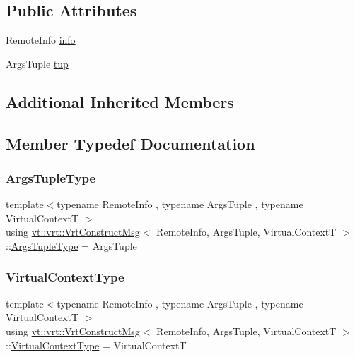 \subsection*{Public Attributes}
\begin{DoxyCompactItemize}
\item 
Remote\+Info \hyperlink{structvt_1_1vrt_1_1_vrt_construct_msg_a570a118633d088ea4b0cae7e0edfb716}{info}
\item 
Args\+Tuple \hyperlink{structvt_1_1vrt_1_1_vrt_construct_msg_a5d74ba39e846fba16e6cc83c33c21fe2}{tup}
\end{DoxyCompactItemize}
\subsection*{Additional Inherited Members}


\subsection{Member Typedef Documentation}
\mbox{\label{structvt_1_1vrt_1_1_vrt_construct_msg_a5ec9caa553a3004bce6a6ee151d15900}} 
\subsubsection{\texorpdfstring{Args\+Tuple\+Type}{ArgsTupleType}}
{\footnotesize\ttfamily template$<$typename Remote\+Info , typename Args\+Tuple , typename Virtual\+ContextT $>$ \\
using \hyperlink{structvt_1_1vrt_1_1_vrt_construct_msg}{vt\+::vrt\+::\+Vrt\+Construct\+Msg}$<$ Remote\+Info, Args\+Tuple, Virtual\+ContextT $>$\+::\hyperlink{structvt_1_1vrt_1_1_vrt_construct_msg_a5ec9caa553a3004bce6a6ee151d15900}{Args\+Tuple\+Type} =  Args\+Tuple}

\mbox{\label{structvt_1_1vrt_1_1_vrt_construct_msg_aa5ff9ea61a1fcefeb0272fa0f5b6adc9}} 
\subsubsection{\texorpdfstring{Virtual\+Context\+Type}{VirtualContextType}}
{\footnotesize\ttfamily template$<$typename Remote\+Info , typename Args\+Tuple , typename Virtual\+ContextT $>$ \\
using \hyperlink{structvt_1_1vrt_1_1_vrt_construct_msg}{vt\+::vrt\+::\+Vrt\+Construct\+Msg}$<$ Remote\+Info, Args\+Tuple, Virtual\+ContextT $>$\+::\hyperlink{structvt_1_1vrt_1_1_vrt_construct_msg_aa5ff9ea61a1fcefeb0272fa0f5b6adc9}{Virtual\+Context\+Type} =  Virtual\+ContextT}



